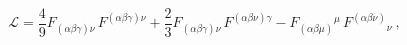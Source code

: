 \begin{equation}
\mathcal{L}=\frac{4}{9}F_{(\alpha \beta \gamma )\nu }\,F^{(\alpha \beta
\gamma )\nu }+\frac{2}{3}F_{(\alpha \beta \gamma )\nu }\,F^{(\alpha \beta
\nu )\gamma }-F_{(\alpha \beta \mu )}{}^{\mu }\,F^{(\alpha \beta \nu
)}{}_{\nu }\ ,  \label{LT0}
\end{equation}%
